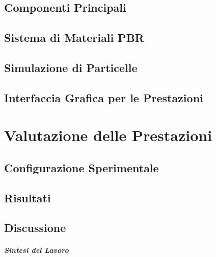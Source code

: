 \documentclass[12pt,a4paper,openright,twoside]{book}
\begin{document}
\section{Componenti Principali}

\section{Sistema di Materiali PBR}

\section{Simulazione di Particelle}

\section{Interfaccia Grafica per le Prestazioni}

\chapter{Valutazione delle Prestazioni}
\label{chap:valutazione}

\section{Configurazione Sperimentale}

\section{Risultati}

\section{Discussione}

\label{chap:conclusioni}

\paragraph{Sintesi del Lavoro}
\end{document}
